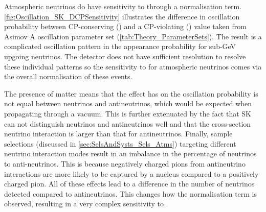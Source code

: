 Atmospheric neutrinos do have sensitivity to \dcp through a normalisation term. \autoref{fig:Oscillation_SK_DCPSensitivity} illustrates the difference in oscillation probability between CP-conserving () and a CP-violating () value taken from Asimov A oscillation parameter set (\autoref{tab:Theory_ParameterSets}). The result is a complicated oscillation pattern in the appearance probability for sub-GeV upgoing neutrinos. The detector does not have sufficient resolution to resolve these individual patterns so the sensitivity to \dcp for atmospheric neutrinos comes via the overall normalisation of these events.

The presence of matter means that the effect \dcp has on the oscillation probability is not equal between neutrinos and antineutrinos, which would be expected when propagating through a vacuum. This is further extenuated by the fact that SK can not distinguish neutrinos and antineutrinos well and that the cross-section neutrino interaction is larger than that for antineutrinos. Finally, sample selections (discussed in \autoref{sec:SelsAndSysts_Sels_Atms}) targeting different neutrino interaction modes result in an imbalance in the percentage of neutrinos to anti-neutrinos. This is because negatively charged pions from antineutrino interactions are more likely to be captured by a nucleus compared to a positively charged pion. All of these effects lead to a difference in the number of neutrinos detected compared to antineutrinos. This changes how the \dcp normalisation term is observed, resulting in a very complex sensitivity to \dcp.

